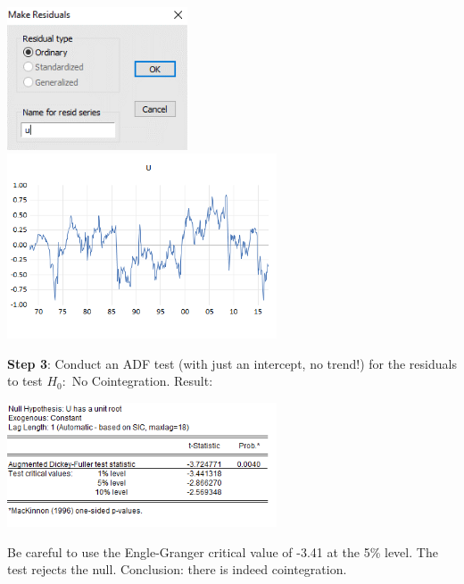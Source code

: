 \documentclass[11pt, a4paper]{article}
\begin{document}
\begin{enumerate}
\begin{enumerate}
\begin{center}
\includegraphics[width=0.4\textwidth]{residualseviews2}
\includegraphics[width=0.6\textwidth]{residuals}
\end{center}

\noindent\textbf{Step 3}: Conduct an ADF test (with just an intercept, no trend!) for the residuals to test $H_0:$ No Cointegration. Result:

\begin{center}
\includegraphics[width=0.6\textwidth]{englegrangertest}
\end{center}

Be careful to use the Engle-Granger critical value of -3.41 at the 5\% level. The test rejects the null. Conclusion: there is indeed cointegration.


\end{enumerate}
\end{enumerate}
\end{document}
